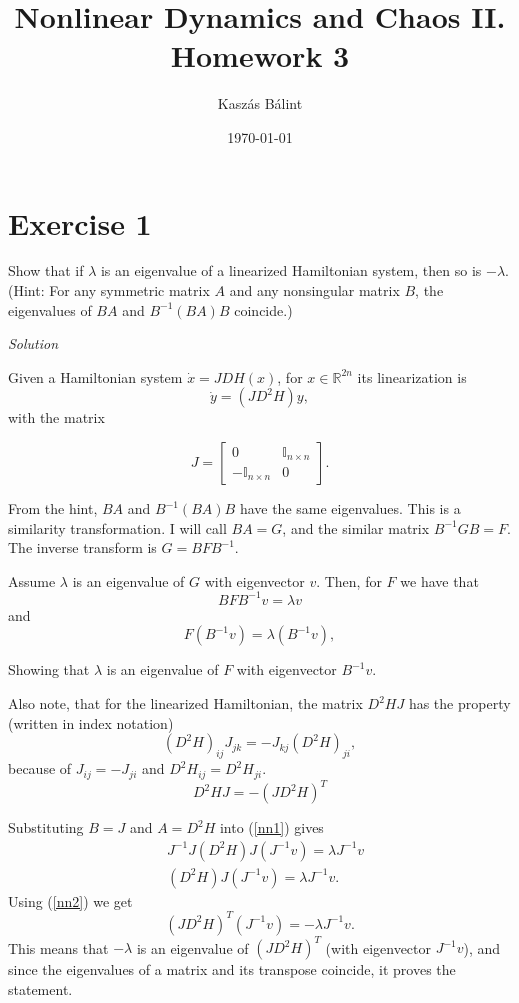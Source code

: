 \documentclass[a4paper,11pt,pdftex]{article}
\title{Nonlinear Dynamics and Chaos II. \\ Homework 3}
\author{Kaszás Bálint}
\date{\today}
\begin{document}
\pagestyle{fancy}

\maketitle


\section*{Exercise 1}
Show that if $\lambda$ is an eigenvalue of a linearized Hamiltonian system, then so is $-\lambda$. (Hint: For any symmetric matrix $A$ and any nonsingular matrix $B$, the eigenvalues of $BA$ and $B^{-1}(BA)B$ coincide.)

\emph{Solution}

Given a Hamiltonian system $\dot{x} = JDH(x)$, for $x\in \mathbb{R}^{2n}$ its linearization is 
$$
\dot{y} = (JD^2H)y,
$$
with the matrix 

$$J = \begin{bmatrix}
    0 & \mathbb{I}_{n\times n} \\
    -\mathbb{I}_{n\times n} &  0
\end{bmatrix}.
$$

From the hint, $BA$ and $B^{-1}(BA)B$ have the same eigenvalues. This is a similarity transformation. I will call $BA=G$, and the similar matrix $B^{-1}GB=F$. The inverse transform is $G=BFB^{-1}$. 

Assume $\lambda$ is an eigenvalue of $G$ with eigenvector $v$. Then, for $F$ we have that
$$
BFB^{-1}v = \lambda v
$$
and 
\begin{equation}
\label{nn1}
    F(B^{-1}v) = \lambda (B^{-1}v),
\end{equation}


Showing that $\lambda$ is an eigenvalue of $F$ with eigenvector $B^{-1}v$.

Also note, that for the linearized Hamiltonian, the matrix $D^2HJ$ has the property (written in index notation) 
$$
(D^2H)_{ij}J_{jk} = - J_{kj}(D^2H)_{ji}, 
$$
because of $J_{ij} = - J_{ji}$ and $D^2H_{ij} = D^2H_{ji}$. 
\begin{equation}
\label{nn2}
     D^2HJ = - (JD^2H)^T
\end{equation}

Substituting $B=J$ and $A=D^2H$ into (\ref{nn1}) gives
\begin{align*}
    &J^{-1}J(D^2H)J(J^{-1}v) = \lambda J^{-1}v \\
    &(D^2H) J (J^{-1}v) = \lambda J^{-1}v.
\end{align*}
Using (\ref{nn2}) we get
$$
(JD^2H)^T(J^{-1}v) = -\lambda J^{-1}v.
$$
This means that $-\lambda$ is an eigenvalue of $(JD^2H)^T$ (with eigenvector $J^{-1}v$), and since the eigenvalues of a matrix and its transpose coincide, it proves the statement. 
\end{document}
